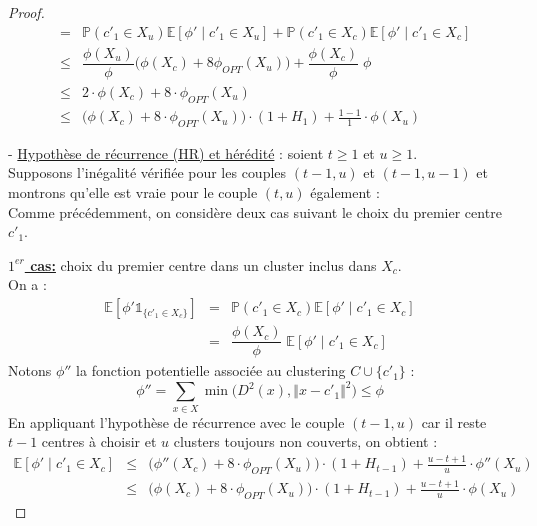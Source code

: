 \documentclass[12pt,a4paper]{book}
\newcommand{\E}{\mathbb{E}}
\newcommand{\p}{\mathbb{P}}
\newcommand{\1}{\mathds{1}}
\begin{document}
\begin{proof}
\begin{eqnarray*}
		 	&=& \p \left( c'_1 \in X_u \right)\E\left[\phi' \; | \; c'_1 \in X_u \right] + \p \left( c'_1 \in X_c \right)\E\left[\phi' \; | \; c'_1 \in X_c \right]\\
		 	& \leq & \dfrac{\phi \left( X_u \right)}{\phi} \bigg( \phi \left( X_c \right) + 8 \phi_{OPT} \left( X_u \right) \bigg) + \dfrac{\phi \left( X_c \right)}{\phi} \; \phi \\
		 	& \leq & 2 \cdot  \phi \left( X_c \right) + 8 \cdot \phi_{OPT} \left( X_u \right) \\
		 	& \leq & \bigg( \phi \left( X_c \right) + 8 \cdot \phi_{OPT} \left( X_u \right) \bigg)  \cdot \left( 1 + H_1 \right) + \frac{1-1}{1} \cdot \phi \left( X_u \right)
		 \end{eqnarray*}
		 \item[-] \underline{Hypothèse de récurrence (HR) et hérédité} : soient $t \geq 1$ et $u \geq 1$.\\
		 Supposons l'inégalité vérifiée pour les couples $(t-1,u)$ et $(t-1,u-1)$ et montrons qu'elle est vraie pour le couple $(t,u)$ également :\\
		  Comme précédemment, on considère deux cas suivant le choix du premier centre $c'_1$.\\
		  \item \underline{\textbf{$1^{er}$ cas:}} choix du premier centre dans un cluster inclus dans $X_c$.\\
		  On a :
		  \begin{eqnarray*}
		  	\E\left[\phi' \1_{\{c'_1 \in X_c\}} \right] &=& \p \left( c'_1 \in X_c \right)\E\left[\phi' \; | \; c'_1 \in X_c \right]\\
		  	&=&  \dfrac{\phi \left( X_c \right)}{\phi} \; \E\left[\phi' \; | \; c'_1 \in X_c \right]
		  \end{eqnarray*}
		  Notons $\phi''$ la fonction potentielle associée au clustering $C \cup \{ c'_1 \}$ :
		  $$
		  	\phi'' = \sum_{x \in X} \min \bigg( D^2(x), \Vert x-c'_1 \Vert^2 \bigg) \leq \phi
		  $$
		  En appliquant l'hypothèse de récurrence avec le couple $(t-1,u)$ car il reste $t-1$ centres à choisir et $u$ clusters toujours non couverts, on obtient : 
		  \begin{eqnarray*}
		  	\E\left[\phi' \; | \; c'_1 \in X_c \right] & \leq & \bigg( \phi'' \left( X_c \right) + 8 \cdot \phi_{OPT} \left( X_u \right) \bigg) \cdot \left( 1 + H_{t-1} \right) + \frac{u-t+1}{u} \cdot \phi'' \left( X_u \right)\\
		  	& \leq & \bigg( \phi \left( X_c \right) + 8 \cdot \phi_{OPT} \left( X_u \right) \bigg) \cdot \left( 1 + H_{t-1} \right) + \frac{u-t+1}{u} \cdot \phi \left( X_u \right)

\end{eqnarray*}
\end{proof}
\end{document}

